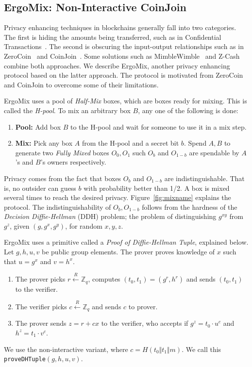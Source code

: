 \documentclass[11pt]{article}
\newcommand{\mixname}{ErgoMix\xspace}
\begin{document}
\subsection{\mixname: Non-Interactive CoinJoin}
\label{mix}

Privacy enhancing techniques in blockchains generally fall into two categories. The first is hiding the amounts being transferred, such as in Confidential Transactions~\cite{ct}. The second is obscuring the input-output relationships such as in ZeroCoin~\cite{zerocoin} and CoinJoin~\cite{coinjoin}. Some solutions such as MimbleWimble~\cite{mw} and Z-Cash~\cite{zcash,zcash1} combine both approaches. We describe \mixname, another privacy enhancing protocol based on the latter approach. The protocol is motivated from ZeroCoin and CoinJoin to overcome some of their limitations.

\mixname uses a pool of {\em Half-Mix} boxes, which are boxes ready for mixing. This is called the {\em H-pool}. 
To mix an arbitrary box $B$, any one of the following is done:
\begin{enumerate}
	\item \textbf{Pool:} Add box $B$ to the H-pool and wait for someone to use it in a mix step.
	\item \textbf{Mix:} Pick any box $A$ from the H-pool and a secret bit $b$. Spend $A, B$ to generate two {\em Fully Mixed} boxes $O_0, O_1$ such $O_b$ and $O_{1-b}$ are spendable by $A$'s and $B$'s owners respectively.
\end{enumerate}

Privacy comes from the fact that boxes $O_b$ and $O_{1-b}$ are indistinguishable. That is, no outsider can guess $b$ with probability better than 1/2. A box is mixed several times to reach the desired privacy. Figure~\ref{fig:mixname} explains the protocol. 
The indistinguishability of $O_b, O_{1-b}$ follows from the hardness of the {\em Decision Diffie-Hellman} (DDH) problem; the problem of distinguishing $g^{xy}$ from $g^z$, given $(g, g^x, g^y)$, for random $x, y, z$. 

\mixname uses a primitive called a {\em Proof of Diffie-Hellman Tuple}, explained below. Let $g, h, u, v$ be public group elements. The prover proves knowledge of $x$ such that $u={g}^x$ and $v={h}^x$. 
\begin{enumerate}
	\item The prover picks $r \stackrel{R}{\leftarrow} \mathbb{Z}_q$, computes $(t_0, t_1) = ({g}^r, {h}^r)$ and sends $(t_0, t_1)$ to the verifier.
	\item The verifier picks $c \stackrel{R}{\leftarrow} \mathbb{Z}_q$ and sends $c$ to prover.
	\item The prover sends $z = r + cx$ to the verifier, who accepts if ${g}^z = {t_0}\cdot {u}^c$ and $h^z=t_1\cdot v^c$. %
\end{enumerate}
We use the non-interactive variant, where $c = H(t_0 \Vert t_1\Vert m)$. We call this \texttt{proveDHTuple}$(g, h, u, v)$.
\end{document}
